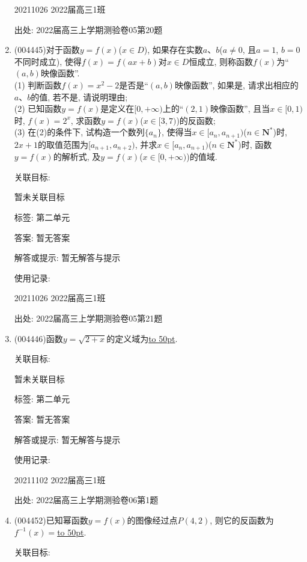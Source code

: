 \documentclass[10pt,a4paper]{article}
\newcommand{\blank}[1]{\underline{\hbox to #1pt{}}}
\begin{document}
\begin{enumerate}[1.]
20211026	2022届高三1班			


出处: 2022届高三上学期测验卷05第20题
\item { (004445)}对于函数$y=f(x)$($x\in D$), 如果存在实数$a$、$b$($a\ne 0$, 且$a=1$, $b=0$不同时成立), 使得$f(x)=f(ax+b)$对$x\in D$恒成立, 则称函数$f(x)$为``$(a,b)$映像函数''.\\
(1) 判断函数$f(x)=x^2-2$是否是``$(a,b)$映像函数'', 如果是, 请求出相应的$a$、$b$的值, 若不是, 请说明理由;\\
(2) 已知函数$y=f(x)$是定义在$[0,+\infty)$上的``$(2,1)$映像函数'', 且当$x\in [0,1)$时, $f(x)=2^x$, 求函数$y=f(x)$($x\in [3,7)$)的反函数;\\
(3) 在(2)的条件下, 试构造一个数列$\{a_n\}$, 使得当$x\in [a_n,{a_{n+1}})$($n\in \mathbf{N}^*$)时, $2x+1$的取值范围为$[{a_{n+1}},{a_{n+2}})$, 并求$x\in [a_n,{a_{n+1}})$($n\in \mathbf{N}^*$)时, 函数$y=f(x)$的解析式, 及$y=f(x)$($x\in [0,+\infty)$)的值域.


关联目标:

暂未关联目标



标签: 第二单元

答案: 暂无答案

解答或提示: 暂无解答与提示

使用记录:

20211026	2022届高三1班			


出处: 2022届高三上学期测验卷05第21题
\item { (004446)}函数$y=\sqrt{2+x}$的定义域为\blank{50}.


关联目标:

暂未关联目标



标签: 第二单元

答案: 暂无答案

解答或提示: 暂无解答与提示

使用记录:

20211102	2022届高三1班	


出处: 2022届高三上学期测验卷06第1题
\item { (004452)}已知幂函数$y=f(x)$的图像经过点$P(4,2)$, 则它的反函数为$f^{-1}(x)=$\blank{50}.


关联目标:


\end{enumerate}
\end{document}
